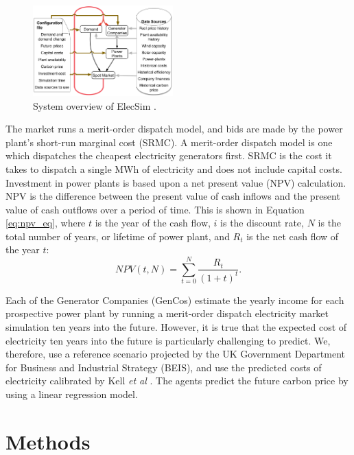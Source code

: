 \documentclass[final,3p,times,twocolumn,numbers]{elsarticle}
\begin{document}
\begin{figure}
    \includegraphics[width=0.48\textwidth,natwidth=610,natheight=400]{figures/methods/System_overview_large.png}
    \caption{System overview of ElecSim \cite{Kell}.}
    \label{fig:model_details}
\end{figure}


The market runs a merit-order dispatch model, and bids are made by the power plant's short-run marginal cost (SRMC). A merit-order dispatch model is one which dispatches the cheapest electricity generators first. SRMC is the cost it takes to dispatch a single MWh of electricity and does not include capital costs. Investment in power plants is based upon a net present value (NPV) calculation. NPV is the difference between the present value of cash inflows and the present value of cash outflows over a period of time. This is shown in Equation \ref{eq:npv_eq}, where $t$ is the year of the cash flow, $i$ is the discount rate, $N$ is the total number of years, or lifetime of power plant, and $R_t$ is the net cash flow of the year $t$:
\begin{equation} \label{eq:npv_eq}
NPV(t, N) = \sum_{t=0}^{N}\frac{R_t}{(1+t)^t}.
\end{equation}

Each of the Generator Companies (GenCos) estimate the yearly income for each prospective power plant by running a merit-order dispatch electricity market simulation ten years into the future. However, it is true that the expected cost of electricity ten years into the future is particularly challenging to predict. We, therefore, use a reference scenario projected by the UK Government Department for Business and Industrial Strategy (BEIS), and use the predicted costs of electricity calibrated by Kell \textit{et al} \cite{Kell2020, DBEIS2019}. The agents predict the future carbon price by using a linear regression model.


 
\section{Methods}
\label{sec:methods}
\end{document}
